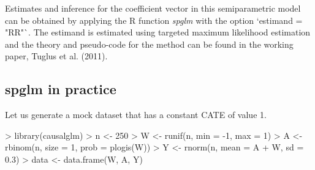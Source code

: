 \documentclass{article}
\begin{document}
Estimates and inference for the coefficient vector in this semiparametric model can be obtained by applying the R function \textit{spglm} with the option `estimand = "RR"`. The estimand is estimated using targeted maximum likelihood estimation and the theory and pseudo-code for the method can be found in the working paper, Tuglus et al. (2011).\nocite{TMLERR} 

\subsection{spglm in practice}

Let us generate a mock dataset that has a constant CATE of value 1.
\begin{Schunk}
\begin{Sinput}
> library(causalglm)
> n <- 250
> W <- runif(n, min = -1, max = 1)
> A <- rbinom(n, size = 1, prob = plogis(W))
> Y <- rnorm(n, mean = A + W, sd = 0.3)
> data <- data.frame(W, A, Y)
\end{Sinput}
\end{Schunk}
\end{document}
